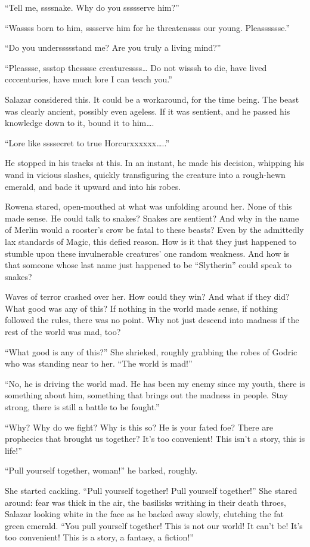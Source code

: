 “Tell me, ssssnake. Why do you ssssserve him?”

“Wassss born to him, sssserve him for he threatenssss our young. Pleasssssse.”

“Do you underssssstand me? Are you truly a living mind?”

“Pleassse, ssstop thesssse creaturessss… Do not wisssh to die, have lived ccccenturies, have much lore I can teach you.”

Salazar considered this. It could be a workaround, for the time being. The beast was clearly ancient, possibly even ageless. If it was sentient, and he passed his knowledge down to it, bound it to him….

“Lore like ssssecret to true Horcurxxxxxx…..”

He stopped in his tracks at this. In an instant, he made his decision, whipping his wand in vicious slashes, quickly transfiguring the creature into a rough-hewn emerald, and bade it upward and into his robes.

Rowena stared, open-mouthed at what was unfolding around her. None of this made sense. He could talk to snakes? Snakes are sentient? And why in the name of Merlin would a rooster’s crow be fatal to these beasts? Even by the admittedly lax standards of Magic, this defied reason. How is it that they just happened to stumble upon these invulnerable creatures’ one random weakness. And how is that someone whose last name just happened to be “Slytherin” could speak to snakes?

Waves of terror crashed over her. How could they win? And what if they did? What good was any of this? If nothing in the world made sense, if nothing followed the rules, there was no point. Why not just descend into madness if the rest of the world was mad, too?

“What good is any of this?” She shrieked, roughly grabbing the robes of Godric who was standing near to her. “The world is mad!”

“No, he is driving the world mad. He has been my enemy since my youth, there is something about him, something that brings out the madness in people. Stay strong, there is still a battle to be fought.”

“Why? Why do we fight? Why is this so? He is your fated foe? There are prophecies that brought us together? It’s too convenient! This isn’t a story, this is life!”

“Pull yourself together, woman!” he barked, roughly.

She started cackling. “Pull yourself together! Pull yourself together!” She stared around: fear was thick in the air, the basilisks writhing in their death throes, Salazar looking white in the face as he backed away slowly, clutching the fat green emerald. “You pull yourself together! This is not our world! It can’t be! It’s too convenient! This is a story, a fantasy, a fiction!”

